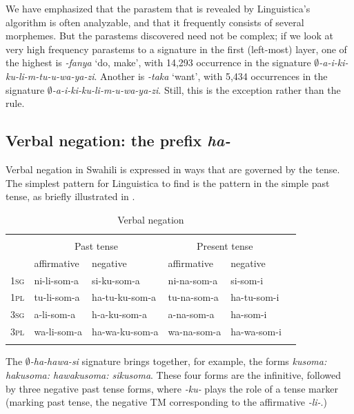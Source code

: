 \documentclass[output=paper,colorlinks,citecolor=brown]{langscibook}
\begin{document}
We have emphasized that the parastem that is revealed by Linguistica's algorithm is often analyzable, and that it frequently consists of several morphemes. But the parastems discovered need not be complex; if we look at very high frequency parastems to a signature in the first (left-most) layer, one of the highest is \textit{-fanya} `do, make', with 14,293 occurrence in the signature \textit{$\emptyset$-a-i-ki-ku-li-m-tu-u-wa-ya-zi}. Another is \textit{-taka} `want', with 5,434 occurrences in the signature  \textit{$\emptyset$-a-i-ki-ku-li-m-u-wa-ya-zi}. Still, this is the exception rather than the rule.
 
\subsection{Verbal negation: the prefix \textit{ha-}}

Verbal negation in Swahili is expressed in ways that are governed by the tense. The simplest pattern for Linguistica to find  is the pattern in the simple past tense, as briefly illustrated in .

\begin{table}
\begin{tabular}{llllll} \lsptoprule
\multicolumn{5}{c}{\textit{ku-som-a} `to read'}\\
 & \multicolumn{2}{c}{Past tense} & \multicolumn{2}{c}{Present tense} \\\cmidrule(lr){2-3}\cmidrule(lr){4-5}
 & affirmative & negative & affirmative & negative \\\midrule
\textsc{1sg} & ni-li-som-a & si-ku-som-a & ni-na-som-a & si-som-i \\
\textsc{1pl}& tu-li-som-a  & ha-tu-ku-som-a & tu-na-som-a & ha-tu-som-i \\
\textsc{3sg}& a-li-som-a  & h-a-ku-som-a & a-na-som-a & ha-som-i \\
\textsc{3pl} & wa-li-som-a & ha-wa-ku-som-a & wa-na-som-a & ha-wa-som-i \\\lspbottomrule
\end{tabular} 
\caption{Verbal negation}
\label{negation}
\end{table}

The \textit{$\emptyset$-ha-hawa-si} signature brings together, for example, the forms \textit{kusoma: hakusoma: hawakusoma: sikusoma}. These four forms are the infinitive, followed by three negative past tense forms, where \textit{-ku-} plays the role of a tense marker (marking past tense, the negative TM corresponding to the affirmative \textit{-li-}.) 
\end{document}
